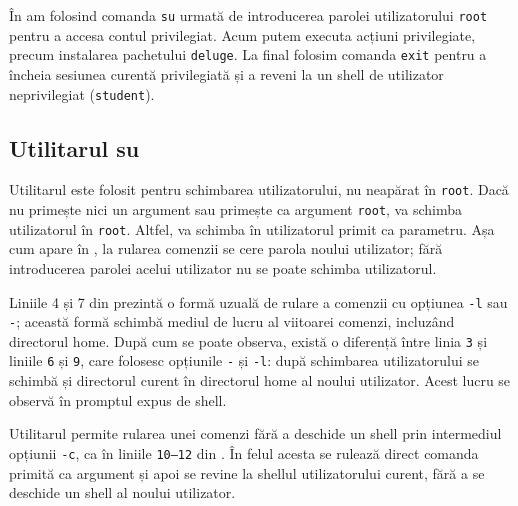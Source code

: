 În  am folosind comanda \texttt{su} urmată de introducerea parolei utilizatorului \texttt{root} pentru a accesa contul privilegiat.
Acum putem executa acțiuni privilegiate, precum instalarea pachetului \texttt{deluge}.
La final folosim comanda \texttt{exit} pentru a încheia sesiunea curentă privilegiată și a reveni la un shell de utilizator neprivilegiat (\texttt{student}).

\subsection{Utilitarul su}
\label{sec:user:su}

Utilitarul  este folosit pentru schimbarea utilizatorului, nu neapărat în \texttt{root}.
Dacă  nu primește nici un argument sau primește ca argument \texttt{root}, va schimba utilizatorul în \texttt{root}.
Altfel, va schimba în utilizatorul primit ca parametru.
Așa cum apare în , la rularea comenzii  se cere parola noului utilizator;
fără introducerea parolei acelui utilizator nu se poate schimba utilizatorul.


Liniile 4 și 7 din  prezintă o formă uzuală de rulare a comenzii  cu opțiunea \texttt{-l} sau \texttt{-};
această formă schimbă mediul de
lucru al viitoarei comenzi, incluzând directorul home.
După cum se poate observa, există o diferență între linia \texttt{3} și liniile \texttt{6} și \texttt{9}, care folosesc opțiunile \texttt{-} și \texttt{-l}: după schimbarea utilizatorului se schimbă și directorul curent în directorul home al noului utilizator.
Acest lucru se observă în promptul expus de shell.

Utilitarul  permite rularea unei comenzi fără a deschide un shell prin intermediul opțiunii \texttt{-c}, ca în liniile \texttt{10--12} din .
În felul acesta se rulează direct comanda primită ca argument și apoi se revine la shellul utilizatorului curent, fără a se deschide un shell al noului utilizator.


